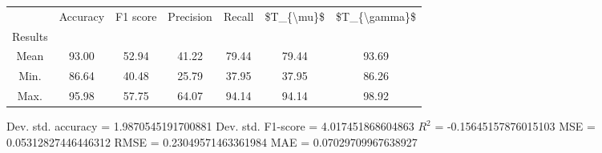 \begin{tabular}{|c|c|c|c|c|c|c|}
\toprule
{} &  Accuracy &  F1 score &  Precision &  Recall &  \$T\_\{\textbackslash mu\}\$ &  \$T\_\{\textbackslash gamma\}\$ \\
Results &           &           &            &         &            &               \\
\hline
Mean    &     93.00 &     52.94 &      41.22 &   79.44 &      79.44 &         93.69 \\
Min.    &     86.64 &     40.48 &      25.79 &   37.95 &      37.95 &         86.26 \\
Max.    &     95.98 &     57.75 &      64.07 &   94.14 &      94.14 &         98.92 \\
\bottomrule
\end{tabular}

 Dev. std. accuracy = 1.9870545191700881
 Dev. std. F1-score = 4.017451868604863
 $R^2$ = -0.15645157876015103
 MSE = 0.05312827446446312
 RMSE = 0.23049571463361984
 MAE = 0.07029709967638927